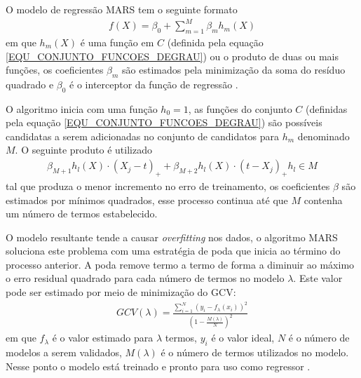 \noindent
O modelo de regressão MARS tem o seguinte formato
\begin{align}
f(X) = \beta_{0} + \sum\limits_{m=1}^{M}\beta_{m}h_{m}(X)
\end{align}
em que \(h_{m}(X)\) é uma função em \(C\) (definida pela equação \eqref{EQU_CONJUNTO_FUNCOES_DEGRAU}) ou o produto de duas ou mais funções, os coeficientes \(\beta_{m}\) são estimados pela minimização da soma do resíduo quadrado e \(\beta_{0}\) é o interceptor da função de regressão \cite{StatisticalLearning2001}.

O algoritmo inicia com uma função \(h_{0} = 1\), as funções do conjunto \(C\) (definidas pela equação \eqref{EQU_CONJUNTO_FUNCOES_DEGRAU}) são possíveis candidatas a serem adicionadas no conjunto de candidatos para \(h_{m}\) denominado \(M\). O seguinte produto é utilizado
\begin{align}
\beta_{M+1}h_{l}(X) \cdot (X_{j}-t)_{+} + \beta_{M+2}h_{l}(X) \cdot (t-X_{j})_{+} h_{l} \in M
\end{align}
tal que produza o menor incremento no erro de treinamento, os coeficientes \(\beta\) são estimados por mínimos quadrados, esse processo continua até que \(M\) contenha um número de termos estabelecido. 

O modelo resultante tende a causar \emph{overfitting} nos dados, o algoritmo MARS soluciona este problema com uma estratégia de poda que inicia ao término  do processo anterior. A poda remove termo a termo de forma a diminuir ao máximo o erro residual quadrado para cada número de termos no modelo \(\lambda\). Este valor pode ser estimado por meio de minimização do GCV:
\begin{align}
GCV(\lambda) = \frac{\sum\limits_{i=1}^{N}(y_{i} - f_{\lambda}(x_{i}))^{2}}{(1-\frac{M(\lambda)}{N})^{2}}
\end{align}
em que \(f_{\lambda}\) é o valor estimado para \(\lambda\) termos, \(y_{i}\) é o valor ideal, \(N\) é o número de modelos a serem validados, \(M(\lambda)\) é o número de termos utilizados no modelo. Nesse ponto o modelo está treinado e pronto para uso como regressor \cite{StatisticalLearning2001}.

